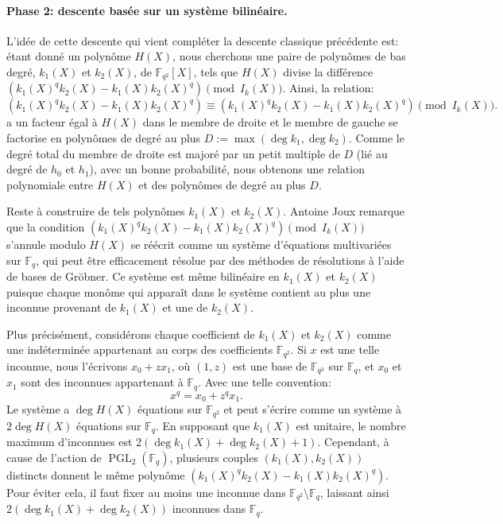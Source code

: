 \documentclass[a4paper, titlepage, 11pt]{article}
\theoremstyle{definition}
\theoremstyle{remark}
\def\gf #1{\mathbb{F}_{#1}}
\begin{document}
\paragraph{Phase 2: descente basée sur un système bilinéaire.}L'idée de cette descente qui vient compléter la descente classique précédente est: étant donné un polynôme $H(X)$, nous cherchons une paire de polynômes de bas degré, $k_1(X)$ et $k_2(X)$, de $\gf{q^2}[X]$, tels que $H(X)$ divise la différence $(k_1(X)^qk_2(X)-k_1(X)k_2(X)^q) \pmod{I_k(X)}$. Ainsi, la relation:
$$(k_1(X)^qk_2(X)-k_1(X)k_2(X)^q) \equiv (k_1(X)^qk_2(X)-k_1(X)k_2(X)^q) \pmod{I_k(X)}.$$
a un facteur égal à $H(X)$ dans le membre de droite et le membre de gauche se factorise en polynômes de degré au plus $D := \max(\deg k_1, \deg k_2)$. Comme le degré total du membre de droite est majoré par un petit multiple de $D$ (lié au degré de $h_0$ et $h_1$), avec un bonne probabilité, nous obtenons une relation polynomiale entre $H(X)$ et des polynômes de degré au plus $D$.

Reste à construire de tels polynômes $k_1(X)$ et $k_2(X)$. Antoine Joux \cite{joux2013} remarque que la condition $(k_1(X)^qk_2(X)-k_1(X)k_2(X)^q) \pmod{I_k(X)}$ s'annule modulo $H(X)$ se réécrit comme un système d'équations multivariées sur $\gf{q}$, qui peut être efficacement résolue par des méthodes de résolutions à l'aide de bases de Gröbner. 
Ce système est même bilinéaire en $k_1(X)$ et $k_2(X)$ puisque chaque monôme qui apparaît dans le système contient au plus une inconnue provenant de $k_1(X)$ et une de $k_2(X)$.

Plus précisément, considérons chaque coefficient de $k_1(X)$ et $k_2(X)$ comme une indéterminée appartenant au corps des coefficients $\gf{q^2}$. Si $x$ est une telle inconnue, nous l'écrivons $x_0 + zx_1$, où $(1,z)$ est une base de $\gf{q^2}$ sur $\gf{q}$, et $x_0$ et $x_1$ sont des inconnues appartenant à $\gf{q}$. Avec une telle convention: $$x^q = x_0 + z^qx_1.$$
Le système a $\deg H(X)$ équations sur $\gf{q^2}$ et peut s'écrire comme un système à $2\deg H(X)$ équations sur $\gf{q}$. En supposant que $k_1(X)$ est unitaire, le nombre maximum d'inconnues est $2(\deg k_1(X) + \deg k_2(X) + 1)$. Cependant, à cause de l'action de $\operatorname{PGL}_2(\gf{q})$, plusieurs couples $(k_1(X),k_2(X))$ distincts donnent le même polynôme $(k_1(X)^qk_2(X)-k_1(X)k_2(X)^q)$. Pour éviter cela, il faut fixer au moins une inconnue dans $\gf{q^2} \setminus \gf{q}$, laissant ainsi $2(\deg k_1(X) + \deg k_2(X))$ inconnues dans $\gf{q}$. 
\end{document}
